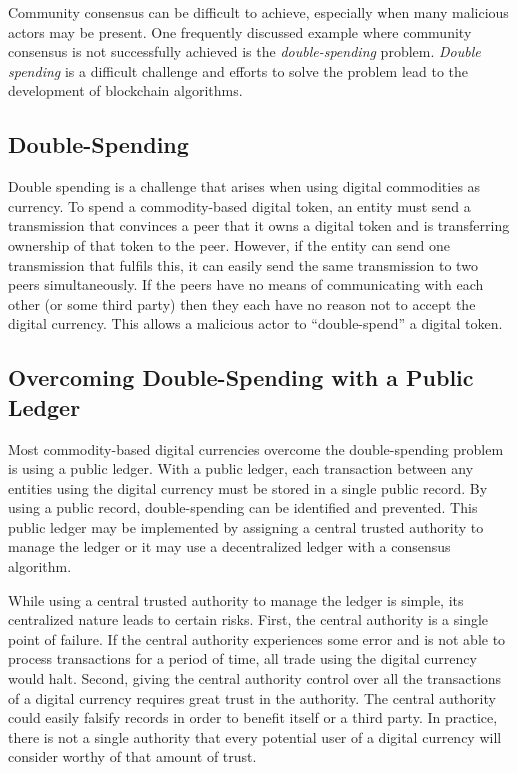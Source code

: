 \documentclass[runningheads]{llncs}
\begin{document}
Community consensus can be difficult to achieve, especially when many malicious actors may be present. One frequently discussed example where community consensus is not successfully achieved is the \emph{double-spending} problem. \emph{Double spending} is a difficult challenge and efforts to solve the problem lead to the development of blockchain algorithms. 

\subsection{Double-Spending}
Double spending is a challenge that arises when using digital commodities as currency. To spend a commodity-based digital token, an entity must send a transmission that convinces a peer that it owns a digital token and is transferring ownership of that token to the peer. However, if the entity can send one transmission that fulfils this, it can easily send the same transmission to two peers simultaneously. If the peers have no means of communicating with each other (or some third party) then they each have no reason not to accept the digital currency. This allows a malicious actor to “double-spend” a digital token.

\subsection{Overcoming Double-Spending with a Public Ledger}
Most commodity-based digital currencies overcome the double-spending problem is using a public ledger. With a public ledger, each transaction between any entities using the digital currency must be stored in a single public record. By using a public record, double-spending can be identified and prevented. This public ledger may be implemented by assigning a central trusted authority to manage the ledger or it may use a decentralized ledger with a consensus algorithm. 

While using a central trusted authority to manage the ledger is simple, its centralized nature leads to certain risks. First, the central authority is a single point of failure. If the central authority experiences some error and is not able to process transactions for a period of time, all trade using the digital currency would halt. Second, giving the central authority control over all the transactions of a digital currency requires great trust in the authority. The central authority could easily falsify records in order to benefit itself or a third party. In practice, there is not a single authority that every potential user of a digital currency will consider worthy of that amount of trust.
\end{document}
